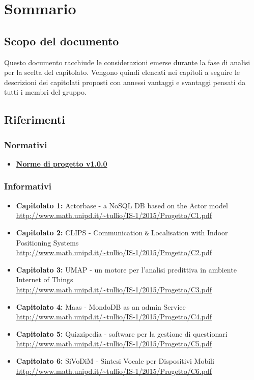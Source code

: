 \documentclass{scalatekids-article}
\begin{document}
\section{Sommario}
\subsection{Scopo del documento}
Questo documento racchiude le considerazioni emerse durante la fase di analisi per la scelta del capitolato.
Vengono quindi elencati nei capitoli a seguire le descrizioni dei capitolati proposti con annessi vantaggi e svantaggi pensati da tutti i membri del gruppo.
\prodPurpose
\glossExpl
\subsection{Riferimenti}
\subsubsection{Normativi}
\begin{itemize}
  \item \href{run:NormeDiProgetto_v0.0.1.text}{\textbf{Norme di progetto v1.0.0}}
\end{itemize}
\subsubsection{Informativi}
\begin{itemize}
  \item \textbf{Capitolato 1:} Actorbase - a NoSQL DB based on the Actor model\\
  \url{http://www.math.unipd.it/~tullio/IS-1/2015/Progetto/C1.pdf}
  \item \textbf{Capitolato 2:} CLIPS - Communication \verb=&= Localisation with Indoor Positioning Systems\\
  \url{http://www.math.unipd.it/~tullio/IS-1/2015/Progetto/C2.pdf}
  \item \textbf{Capitolato 3:} UMAP - un motore per l'analisi predittiva in ambiente Internet of Things \\
  \url{http://www.math.unipd.it/~tullio/IS-1/2015/Progetto/C3.pdf}
  \item \textbf{Capitolato 4:} Maas - MondoDB as an admin Service \\
  \url{http://www.math.unipd.it/~tullio/IS-1/2015/Progetto/C4.pdf}
  \item \textbf{Capitolato 5:} Quizzipedia - software per la gestione di questionari \\
  \url{http://www.math.unipd.it/~tullio/IS-1/2015/Progetto/C5.pdf}
  \item \textbf{Capitolato 6:} SiVoDiM - Sintesi Vocale per Dispositivi Mobili \\
  \url{http://www.math.unipd.it/~tullio/IS-1/2015/Progetto/C6.pdf}
\end{itemize}
\end{document}
